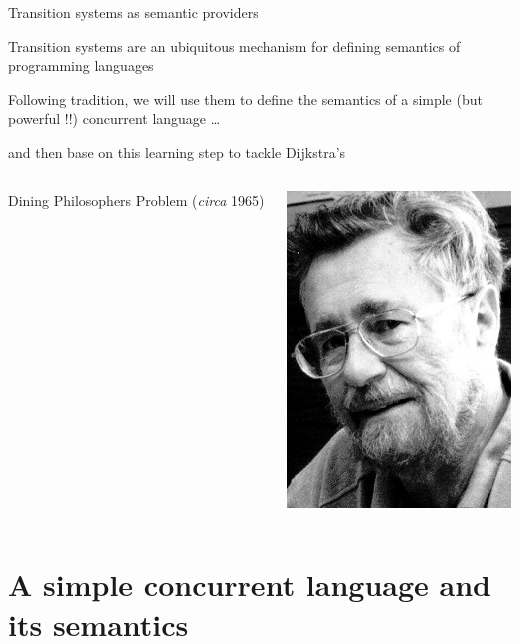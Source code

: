 \documentclass{beamer}
\begin{document}
\begin{frame}{Transition systems as semantic providers}

  Transition systems are an \alert{ubiquitous mechanism} for defining semantics
  of programming languages 

  \vfill
  Following tradition, we will use them to define the
  semantics of a simple (but powerful !!) concurrent language \dots\

  and then base on this learning step to tackle Dijkstra's 

  \vspace{3.5pt}
  \begin{minipage}[0.3\textheight]{\textwidth}
  \begin{columns}[c]
  \begin{column}{0.7\textwidth}
    Dining Philosophers Problem (\emph{circa} 1965)
  \end{column}
  \begin{column}{0.22\textwidth}
    \includegraphics[scale=1.1]{images/Dijkstra.jpg}
  \end{column}
  \end{columns}
  \end{minipage}

\end{frame}

\section{A simple concurrent language and its semantics}
\end{document}
